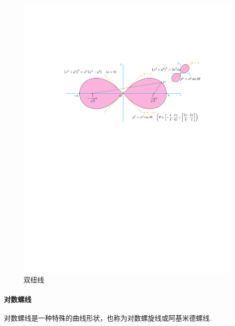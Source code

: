 \begin{figure}[H]
    \centering
    \includegraphics{figures/DoubleTwistedWire.pdf}
    \caption{双纽线}
    \label{doubleTwistedWire}
\end{figure}

\paragraph{对数螺线}

对数螺线是一种特殊的曲线形状，也称为对数螺旋线或阿基米德螺线. 


